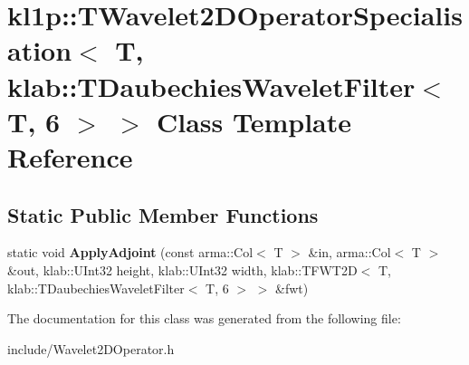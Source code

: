 \hypertarget{classkl1p_1_1TWavelet2DOperatorSpecialisation_3_01T_00_01klab_1_1TDaubechiesWaveletFilter_3_01T_00_016_01_4_01_4}{}\section{kl1p\+:\+:T\+Wavelet2\+D\+Operator\+Specialisation$<$ T, klab\+:\+:T\+Daubechies\+Wavelet\+Filter$<$ T, 6 $>$ $>$ Class Template Reference}
\label{classkl1p_1_1TWavelet2DOperatorSpecialisation_3_01T_00_01klab_1_1TDaubechiesWaveletFilter_3_01T_00_016_01_4_01_4}
\subsection*{Static Public Member Functions}
\begin{DoxyCompactItemize}
\item 
static void {\bfseries Apply\+Adjoint} (const arma\+::\+Col$<$ T $>$ \&in, arma\+::\+Col$<$ T $>$ \&out, klab\+::\+U\+Int32 height, klab\+::\+U\+Int32 width, klab\+::\+T\+F\+W\+T2D$<$ T, klab\+::\+T\+Daubechies\+Wavelet\+Filter$<$ T, 6 $>$ $>$ \&fwt)\hypertarget{classkl1p_1_1TWavelet2DOperatorSpecialisation_3_01T_00_01klab_1_1TDaubechiesWaveletFilter_3_01T_00_016_01_4_01_4_a15ae37eb057c033737a0617424da6fdd}{}\label{classkl1p_1_1TWavelet2DOperatorSpecialisation_3_01T_00_01klab_1_1TDaubechiesWaveletFilter_3_01T_00_016_01_4_01_4_a15ae37eb057c033737a0617424da6fdd}

\end{DoxyCompactItemize}


The documentation for this class was generated from the following file\+:\begin{DoxyCompactItemize}
\item 
include/Wavelet2\+D\+Operator.\+h\end{DoxyCompactItemize}

